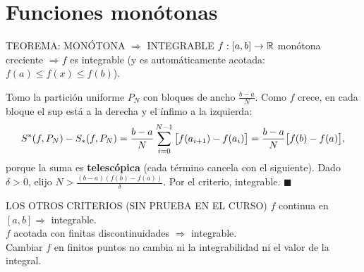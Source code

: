 \section{Funciones monótonas}
\apuntes
\begin{sello}{TEOREMA: MONÓTONA $\Rightarrow$ INTEGRABLE}
$f:[a,b]\to\mathbb{R}$ monótona creciente $\Rightarrow f$ es integrable (y es automáticamente acotada: $f(a)\le f(x)\le f(b)$).
\end{sello}
\begin{demo}
Tomo la partición uniforme $P_N$ con bloques de ancho $\frac{b-a}N$. Como $f$ crece, en cada bloque el sup está a la derecha y el ínfimo a la izquierda:
\[S^{*}(f,P_N)-S_{*}(f,P_N)=\frac{b-a}N\sum_{i=0}^{N-1}\big[f(a_{i+1})-f(a_i)\big]=\frac{b-a}N\big[f(b)-f(a)\big],\]
porque la suma es \textbf{telescópica} (cada término cancela con el siguiente). Dado $\delta>0$, elijo $N>\frac{(b-a)(f(b)-f(a))}\delta$. Por el criterio, integrable. $\blacksquare$
\end{demo}
\agregado
\begin{sello}{LOS OTROS CRITERIOS (SIN PRUEBA EN EL CURSO)}
$f$ continua en $[a,b]\Rightarrow$ integrable.\\
$f$ acotada con finitas discontinuidades $\Rightarrow$ integrable.\\
Cambiar $f$ en finitos puntos no cambia ni la integrabilidad ni el valor de la integral.
\end{sello}

